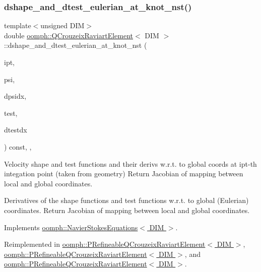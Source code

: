 \subsubsection{\texorpdfstring{dshape\+\_\+and\+\_\+dtest\+\_\+eulerian\+\_\+at\+\_\+knot\+\_\+nst()}{dshape\_and\_dtest\_eulerian\_at\_knot\_nst()}\hspace{0.1cm}{\footnotesize\ttfamily [1/4]}}
{\footnotesize\ttfamily template$<$unsigned D\+IM$>$ \\
double \hyperlink{classoomph_1_1QCrouzeixRaviartElement}{oomph\+::\+Q\+Crouzeix\+Raviart\+Element}$<$ D\+IM $>$\+::dshape\+\_\+and\+\_\+dtest\+\_\+eulerian\+\_\+at\+\_\+knot\+\_\+nst (\begin{DoxyParamCaption}\item[{const unsigned \&}]{ipt,  }\item[{\hyperlink{classoomph_1_1Shape}{Shape} \&}]{psi,  }\item[{\hyperlink{classoomph_1_1DShape}{D\+Shape} \&}]{dpsidx,  }\item[{\hyperlink{classoomph_1_1Shape}{Shape} \&}]{test,  }\item[{\hyperlink{classoomph_1_1DShape}{D\+Shape} \&}]{dtestdx }\end{DoxyParamCaption}) const\hspace{0.3cm}{\ttfamily [inline]}, {\ttfamily [protected]}, {\ttfamily [virtual]}}



Velocity shape and test functions and their derivs w.\+r.\+t. to global coords at ipt-\/th integation point (taken from geometry) Return Jacobian of mapping between local and global coordinates. 

Derivatives of the shape functions and test functions w.\+r.\+t. to global (Eulerian) coordinates. Return Jacobian of mapping between local and global coordinates. 

Implements \hyperlink{classoomph_1_1NavierStokesEquations_a46f9c15f162160fab6419f60ef619916}{oomph\+::\+Navier\+Stokes\+Equations$<$ D\+I\+M $>$}.



Reimplemented in \hyperlink{classoomph_1_1PRefineableQCrouzeixRaviartElement_a1694309d7e0bc7ddd2691784c37cc2f0}{oomph\+::\+P\+Refineable\+Q\+Crouzeix\+Raviart\+Element$<$ D\+I\+M $>$}, \hyperlink{classoomph_1_1PRefineableQCrouzeixRaviartElement_a1537fd64ea853532de2f09b48b0d1db8}{oomph\+::\+P\+Refineable\+Q\+Crouzeix\+Raviart\+Element$<$ D\+I\+M $>$}, and \hyperlink{classoomph_1_1PRefineableQCrouzeixRaviartElement_ab11329961821573134dcc4d97b0b61f0}{oomph\+::\+P\+Refineable\+Q\+Crouzeix\+Raviart\+Element$<$ D\+I\+M $>$}.



